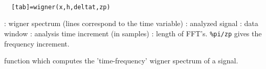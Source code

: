 
\begin{mandesc}
   \\ %
\end{mandesc}
\begin{calling_sequence}
\begin{verbatim}
  [tab]=wigner(x,h,deltat,zp)  
\end{verbatim}
\end{calling_sequence}
\begin{parameters}
  \begin{varlist}
    : wigner spectrum (lines correspond to the time variable)
    : analyzed signal
    : data window
    : analysis time increment (in samples)
    : length of FFT's. \verb!%pi/zp! gives the frequency increment.
  \end{varlist}
\end{parameters}
\begin{mandescription}
  function which computes the 'time-frequency' wigner
  spectrum of a signal.
\end{mandescription}
